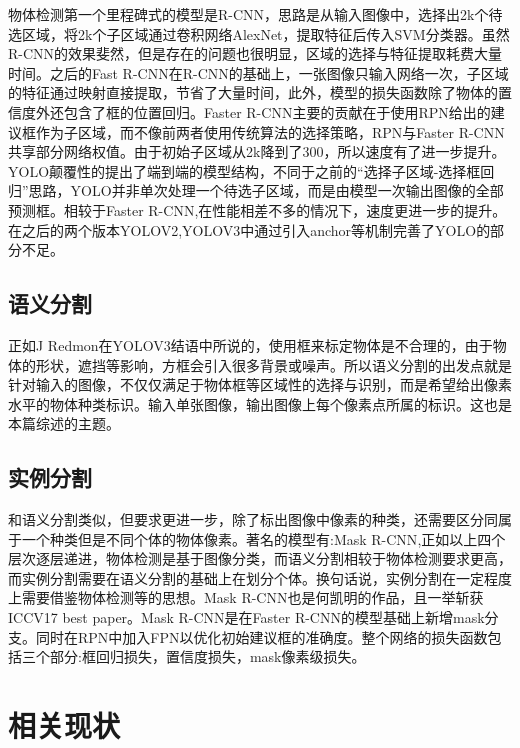 \documentclass{article}
\begin{document}
\begin{CJK}{UTF8}{gbsn}
物体检测第一个里程碑式的模型是R-CNN\cite{girshick2014rich}，思路是从输入图像中，选择出2k个待选区域，将2k个子区域通过卷积网络AlexNet\cite{krizhevsky2012imagenet}，提取特征后传入SVM分类器。虽然R-CNN\cite{girshick2014rich}的效果斐然，但是存在的问题也很明显，区域的选择与特征提取耗费大量时间。之后的Fast R-CNN\cite{girshick2015fast}在R-CNN的基础上，一张图像只输入网络一次，子区域的特征通过映射直接提取，节省了大量时间，此外，模型的损失函数除了物体的置信度外还包含了框的位置回归。Faster R-CNN\cite{ren2015faster}主要的贡献在于使用RPN给出的建议框作为子区域，而不像前两者使用传统算法的选择策略，RPN与Faster R-CNN\cite{ren2015faster}共享部分网络权值。由于初始子区域从2k降到了300，所以速度有了进一步提升。YOLO\cite{redmon2016you}颠覆性的提出了端到端的模型结构，不同于之前的“选择子区域-选择框回归”思路，YOLO\cite{redmon2016you}并非单次处理一个待选子区域，而是由模型一次输出图像的全部预测框。相较于Faster R-CNN,在性能相差不多的情况下，速度更进一步的提升。在之后的两个版本YOLOV2\cite{redmon2017yolo9000},YOLOV3\cite{redmon2018yolov3}中通过引入anchor等机制完善了YOLO\cite{redmon2016you}的部分不足。

\subsection{语义分割}
正如J Redmon在YOLOV3\cite{redmon2018yolov3}结语中所说的，使用框来标定物体是不合理的，由于物体的形状，遮挡等影响，方框会引入很多背景或噪声。所以语义分割的出发点就是针对输入的图像，不仅仅满足于物体框等区域性的选择与识别，而是希望给出像素水平的物体种类标识。输入单张图像，输出图像上每个像素点所属的标识。这也是本篇综述的主题。

\subsection{实例分割}
和语义分割类似，但要求更进一步，除了标出图像中像素的种类，还需要区分同属于一个种类但是不同个体的物体像素。著名的模型有:Mask R-CNN\cite{he2017mask},正如以上四个层次逐层递进，物体检测是基于图像分类，而语义分割相较于物体检测要求更高，而实例分割需要在语义分割的基础上在划分个体。换句话说，实例分割在一定程度上需要借鉴物体检测等的思想。Mask R-CNN\cite{he2017mask}也是何凯明的作品，且一举斩获ICCV17 best paper。Mask R-CNN\cite{he2017mask}是在Faster R-CNN\cite{ren2015faster}的模型基础上新增mask分支。同时在RPN中加入FPN\cite{lin2017feature}以优化初始建议框的准确度。整个网络的损失函数包括三个部分:框回归损失，置信度损失，mask像素级损失。


\section{相关现状}


\end{CJK}
\end{document}
